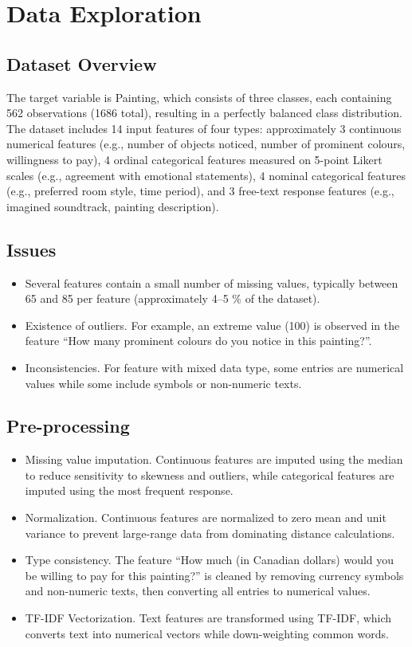 \documentclass[12pt]{article}
\begin{document}
\section{Data Exploration}
\subsection{Dataset Overview}
The target variable is Painting, which consists of three classes, each containing 562 observations (1686 total), resulting in a perfectly balanced class distribution. The dataset includes 14 input features of four types: approximately 3 continuous numerical features (e.g., number of objects noticed, number of prominent colours, willingness to pay), 4 ordinal categorical features measured on 5-point Likert scales (e.g., agreement with emotional statements), 4 nominal categorical features (e.g., preferred room style, time period), and 3 free-text response features (e.g., imagined soundtrack, painting description).

\subsection{Issues}
\begin{itemize}
\item Several features contain a small number of missing values, typically between 65 and 85 per feature (approximately 4–5 \% of the dataset). 
\item Existence of outliers. For example, an extreme value (100) is observed in the feature “How many prominent colours do you notice in this painting?”.
\item Inconsistencies. For feature with mixed data type, some entries are numerical values while some include symbols or non-numeric texts.
\end{itemize}

\subsection{Pre-processing}
\begin{itemize}
\item Missing value imputation. Continuous features are imputed using the median to reduce sensitivity to skewness and outliers, while categorical features are imputed using the most frequent response. 
\item Normalization. Continuous features are normalized to zero mean and unit variance to prevent large-range data from dominating distance calculations.
\item Type consistency. The feature “How much (in Canadian dollars) would you be willing to pay for this painting?” is cleaned by removing currency symbols and non-numeric texts, then converting all entries to numerical values.
\item TF-IDF Vectorization. Text features are transformed using TF-IDF, which converts text into numerical vectors while down-weighting common words.
\end{itemize}
\end{document}
